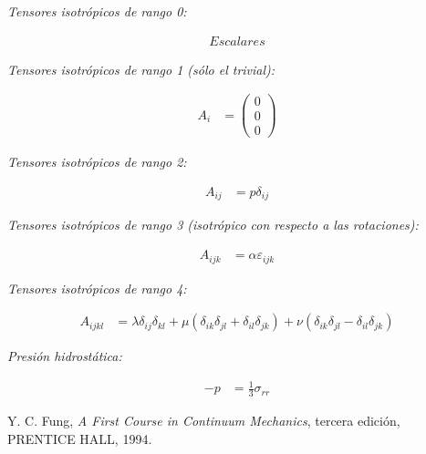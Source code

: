 \documentclass[a4paper,10pt,twoside,final,spanish]{article}
\begin{document}
\textit{Tensores isotrópicos de rango 0:}

\begin{align*}
Escalares
\end{align*}

\vspace{1em}

\textit{Tensores isotrópicos de rango 1 (sólo el trivial):}

\begin{align*}
A_{i} &= \begin{pmatrix}
0 \\
0 \\
0
\end{pmatrix}
\end{align*}

\vspace{1em}

\textit{Tensores isotrópicos de rango 2:}

\begin{align*}
A_{ij} &= p\delta_{ij}
\end{align*}

\vspace{1em}

\textit{Tensores isotrópicos de rango 3 (isotrópico con respecto a las rotaciones):}

\begin{align*}
A_{ijk} &= \alpha\varepsilon_{ijk}
\end{align*}

\vspace{1em}

\textit{Tensores isotrópicos de rango 4:}

\begin{align*}
A_{ijkl} &= \lambda\delta_{ij}\delta_{kl}
+\mu(\delta_{ik}\delta_{jl}+\delta_{il}\delta_{jk})
+\nu(\delta_{ik}\delta_{jl}-\delta_{il}\delta_{jk})
\end{align*}

\vspace{1em}

\textit{Presión hidrostática:}

\begin{align*}
-p &= \frac{1}{3}\sigma_{rr}
\end{align*}

\begin{thebibliography}{99}
Y. C. Fung,
\emph{A First Course in Continuum Mechanics}, 
tercera edición,
PRENTICE HALL,
1994.
\end{thebibliography}
\end{document}
